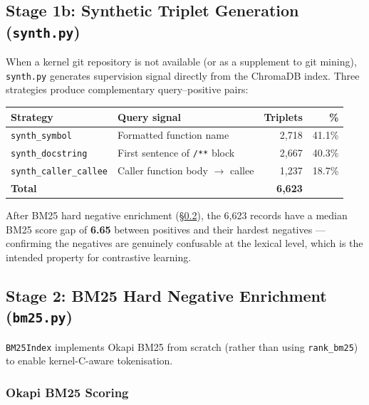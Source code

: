 \documentclass[11pt,a4paper]{article}
\newcommand{\coderef}[1]{\texttt{\small\color{layer2}#1}}
\begin{document}
\subsection{Stage 1b: Synthetic Triplet Generation (\texttt{synth.py})}
\label{sec:synth}

When a kernel git repository is not available (or as a supplement to git
mining), \coderef{synth.py} generates supervision signal directly from the
ChromaDB index. Three strategies produce complementary query--positive pairs:

\begin{center}
\renewcommand{\arraystretch}{1.2}
\begin{tabular}{@{}llrr@{}}
\toprule
\textbf{Strategy} & \textbf{Query signal} & \textbf{Triplets} & \textbf{\%} \\
\midrule
\texttt{synth\_symbol}      & Formatted function name              & 2{,}718 & 41.1\% \\
\texttt{synth\_docstring}   & First sentence of \texttt{/**} block & 2{,}667 & 40.3\% \\
\texttt{synth\_caller\_callee} & Caller function body $\to$ callee & 1{,}237 & 18.7\% \\
\midrule
\textbf{Total}              &                                      & \textbf{6{,}623} & \\
\bottomrule
\end{tabular}
\end{center}

\noindent
After BM25 hard negative enrichment (§\ref{sec:bm25}), the 6{,}623 records
have a median BM25 score gap of \textbf{6.65} between positives and their
hardest negatives --- confirming the negatives are genuinely confusable at the
lexical level, which is the intended property for contrastive learning.

\subsection{Stage 2: BM25 Hard Negative Enrichment (\texttt{bm25.py})}
\label{sec:bm25}

\coderef{BM25Index} implements Okapi BM25 from scratch (rather than using
\texttt{rank\_bm25}) to enable kernel-C-aware tokenisation.

\subsubsection{Okapi BM25 Scoring}
\end{document}
